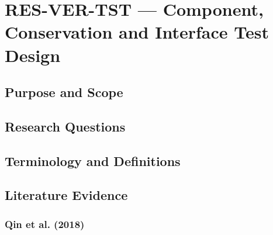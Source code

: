 
\section{RES-VER-TST --- Component, Conservation and Interface Test Design}
\label{sec:res-ver-tst}

\subsection{Purpose and Scope}
\label{sec:res-ver-tst-purpose}


\subsection{Research Questions}
\label{sec:res-ver-tst-research-questions}


\subsection{Terminology and Definitions}
\label{sec:res-ver-tst-definitions}


\subsection{Literature Evidence}
\label{sec:res-ver-tst-literature-evidence}

%

\subsubsection{Qin et al. (2018)}
\label{sec:res-ver-tst-evidence-qin-2018}

